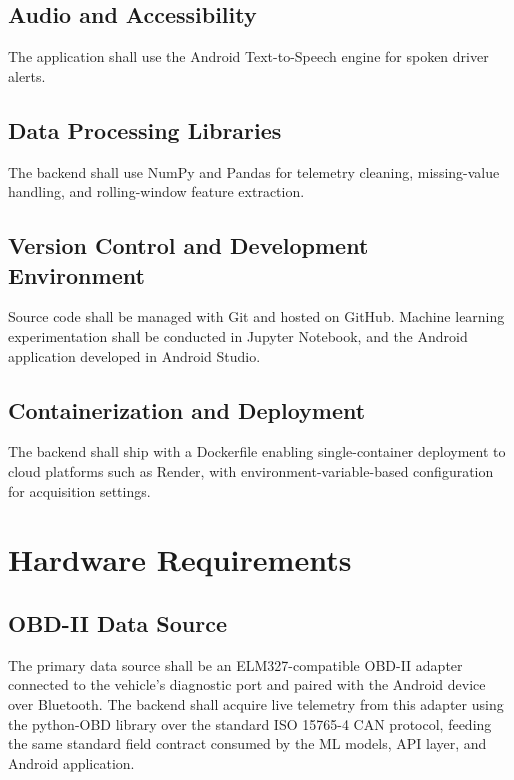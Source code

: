 \documentclass[10pt,a4paper]{report}
\begin{document}
\subsection{Audio and Accessibility}
The application shall use the Android Text-to-Speech engine for spoken driver alerts. \par

\subsection{Data Processing Libraries}
The backend shall use NumPy and Pandas for telemetry cleaning, missing-value handling, and rolling-window feature extraction. \par

\subsection{Version Control and Development Environment}
Source code shall be managed with Git and hosted on GitHub. Machine learning experimentation shall be conducted in Jupyter Notebook, and the Android application developed in Android Studio. \par

\subsection{Containerization and Deployment}
The backend shall ship with a Dockerfile enabling single-container deployment to cloud platforms such as Render, with environment-variable-based configuration for acquisition settings. \par

\section{Hardware Requirements }
\subsection{OBD-II Data Source}
The primary data source shall be an ELM327-compatible OBD-II adapter connected to the vehicle's diagnostic port and paired with the Android device over Bluetooth. The backend shall acquire live telemetry from this adapter using the python-OBD library over the standard ISO 15765-4 CAN protocol, feeding the same standard field contract consumed by the ML models, API layer, and Android application. \par
\end{document}
